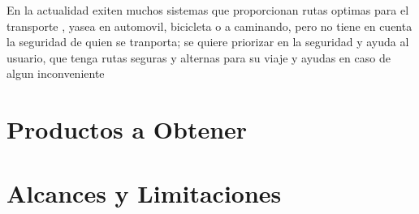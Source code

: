 En la actualidad exiten muchos sistemas que proporcionan rutas optimas para el transporte , yasea en automovil, bicicleta o a caminando, pero no tiene en cuenta la seguridad de quien se tranporta; se quiere priorizar en la seguridad y ayuda al usuario, que tenga rutas seguras y alternas para su viaje y ayudas en caso de algun inconveniente 

\section{Productos a Obtener}

\clearpage



\section{Alcances y Limitaciones}

\clearpage




        
